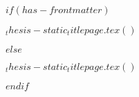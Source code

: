 $if(has-frontmatter)$
  \begin{frontmatter}
    \begin{titlepage}
      $_thesis-static_titlepage.tex()$
    \end{titlepage}
  \end{frontmatter}
$else$
  \begin{titlepage}
    $_thesis-static_titlepage.tex()$
  \end{titlepage}
$endif$
